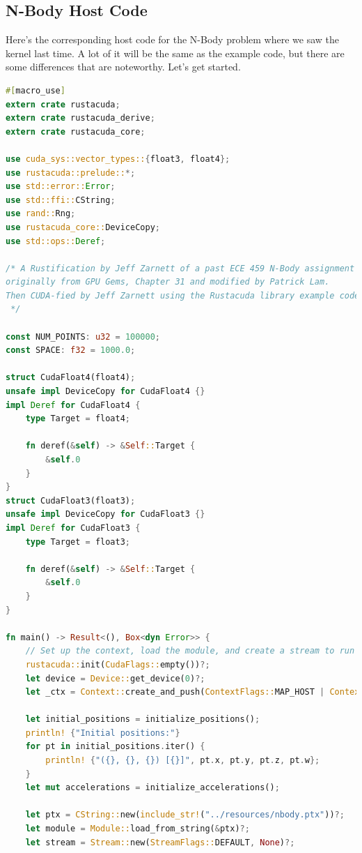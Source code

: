 \subsection*{N-Body Host Code}

Here's the corresponding host code for the N-Body problem where we saw the kernel last time. A lot of it will be the same as the example code, but there are some differences that are noteworthy. Let's get started.

\begin{lstlisting}[language=Rust]
#[macro_use]
extern crate rustacuda;
extern crate rustacuda_derive;
extern crate rustacuda_core;

use cuda_sys::vector_types::{float3, float4};
use rustacuda::prelude::*;
use std::error::Error;
use std::ffi::CString;
use rand::Rng;
use rustacuda_core::DeviceCopy;
use std::ops::Deref;

/* A Rustification by Jeff Zarnett of a past ECE 459 N-Body assignment that was
originally from GPU Gems, Chapter 31 and modified by Patrick Lam.
Then CUDA-fied by Jeff Zarnett using the Rustacuda library example code
 */

const NUM_POINTS: u32 = 100000;
const SPACE: f32 = 1000.0;

struct CudaFloat4(float4);
unsafe impl DeviceCopy for CudaFloat4 {}
impl Deref for CudaFloat4 {
    type Target = float4;

    fn deref(&self) -> &Self::Target {
        &self.0
    }
}
struct CudaFloat3(float3);
unsafe impl DeviceCopy for CudaFloat3 {}
impl Deref for CudaFloat3 {
    type Target = float3;

    fn deref(&self) -> &Self::Target {
        &self.0
    }
}

fn main() -> Result<(), Box<dyn Error>> {
    // Set up the context, load the module, and create a stream to run kernels in.
    rustacuda::init(CudaFlags::empty())?;
    let device = Device::get_device(0)?;
    let _ctx = Context::create_and_push(ContextFlags::MAP_HOST | ContextFlags::SCHED_AUTO, device)?;

    let initial_positions = initialize_positions();
    println! {"Initial positions:"}
    for pt in initial_positions.iter() {
        println! {"({}, {}, {}) [{}]", pt.x, pt.y, pt.z, pt.w};
    }
    let mut accelerations = initialize_accelerations();

    let ptx = CString::new(include_str!("../resources/nbody.ptx"))?;
    let module = Module::load_from_string(&ptx)?;
    let stream = Stream::new(StreamFlags::DEFAULT, None)?;


\end{lstlisting}
